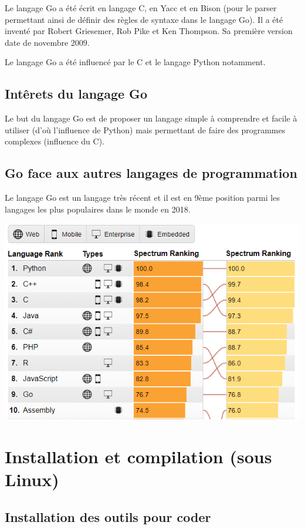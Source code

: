 \documentclass[11pt]{article}
\begin{document}
Le langage Go a été écrit en langage C, en Yacc et en Bison (pour le parser permettant ainsi de définir des règles de syntaxe dans le langage Go). Il a été inventé par Robert Griesemer, Rob Pike et Ken Thompson. Sa première version date de novembre 2009. 

Le langage Go a été influencé par le C et le langage Python notamment. 

\subsection{Intêrets du langage Go}

Le but du langage Go est de proposer un langage simple à comprendre et facile à utiliser (d'où l'influence de Python) mais permettant de faire des programmes complexes (influence du C). 

\subsection{Go face aux autres langages de programmation}

Le langage Go est un langage très récent et il est en 9ème position parmi les langages les plus populaires dans le monde en 2018. 

\begin{center}
	\includegraphics[scale=0.8]{pic/top10.png}
\end{center}

\section{Installation et compilation (sous Linux)}

\subsection{Installation des outils pour coder}
\end{document}

